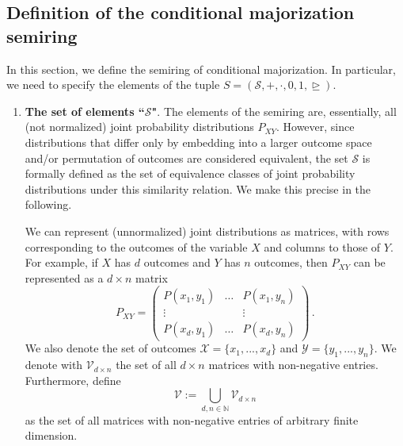 \documentclass[aps,pra,11pt,onecolumn,nofootinbib,tightenlines]{revtex4-2}
\theoremstyle{definition}
\newcommand{\cS}{\mathcal{S}}
\newcommand{\X}{\mathcal{X}}
\newcommand{\Y}{\mathcal{Y}}
\newcommand{\rgeq}{\trianglerighteq}
\begin{document}
\subsection{Definition of the conditional majorization semiring}
In this section, we define the semiring of conditional majorization. In particular, we need to specify the elements of the tuple $S=(\mathcal{S}, +, \cdot, 0, 1, \rgeq)$.

\begin{enumerate}

\item \textbf{The set of elements ``$\cS$"}. The elements of the semiring are, essentially, all (not normalized) joint probability distributions $P_{XY}$.
However, since distributions that differ only by embedding into a larger outcome space and/or permutation of outcomes are considered equivalent, the set $\cS$ is formally defined as the set of equivalence classes of joint probability distributions under this similarity relation. 
We make this precise in the following.

We can represent (unnormalized) joint distributions as matrices, with rows corresponding to the outcomes of the variable $X$ and columns to those of $Y$. For example, if $X$ has $d$ outcomes and $Y$ has $n$ outcomes, then $P_{XY}$ can be represented as a $d \times n$ matrix
\begin{equation}
P_{XY} = \begin{pmatrix}
P(x_1,y_1) & \hdots & P(x_1,y_n) \\
\vdots &  & \vdots \\
P(x_d,y_1) & \hdots & P(x_d,y_n) 
\end{pmatrix} \,.
\end{equation}
We also denote the set of outcomes $\X=\{x_1,...,x_d\}$ and $\Y=\{y_1,...,y_n\}$.
We denote with $\mathcal{V}_{d \times n}$ the set of all $d \times n$ matrices with non-negative entries. Furthermore, define
\begin{equation}
    \mathcal{V} := \bigcup_{d,n \in \mathbb{N}} \mathcal{V}_{d \times n}
\end{equation}
as the set of all matrices with non-negative entries of arbitrary finite dimension.


\end{enumerate}
\end{document}
